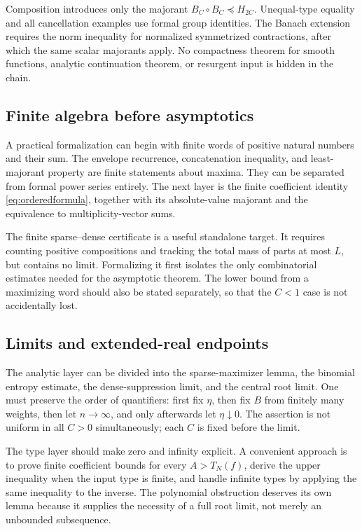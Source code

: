 \documentclass[11pt,a4paper]{article}
\numberwithin{equation}{section}
\theoremstyle{definition}
\theoremstyle{remark}
\newcommand{\Type}{T_N}
\begin{document}
Composition introduces only the majorant
$B_C\circ B_C\preceq H_{2C}$. Unequal-type equality and all cancellation
examples use formal group identities. The Banach extension requires the
norm inequality for normalized symmetrized contractions, after which the
same scalar majorants apply. No compactness theorem for smooth functions,
analytic continuation theorem, or resurgent input is hidden in the chain.

\subsection{Finite algebra before asymptotics}

A practical formalization can begin with finite words of positive natural
numbers and their sum. The envelope recurrence, concatenation inequality,
and least-majorant property are finite statements about maxima. They can
be separated from formal power series entirely. The next layer is the
finite coefficient identity \eqref{eq:orderedformula}, together with
its absolute-value majorant and the equivalence to multiplicity-vector
sums.

The finite sparse--dense certificate is a useful standalone target. It
requires counting positive compositions and tracking the total mass of
parts at most $L$, but contains no limit. Formalizing it first isolates
the only combinatorial estimates needed for the asymptotic theorem.
The lower bound from a maximizing word should also be stated separately,
so that the $C<1$ case is not accidentally lost.

\subsection{Limits and extended-real endpoints}

The analytic layer can be divided into the sparse-maximizer lemma, the
binomial entropy estimate, the dense-suppression limit, and the central
root limit. One must preserve the order of quantifiers: first fix
$\eta$, then fix $B$ from finitely many weights, then let $n\to\infty$,
and only afterwards let $\eta\downarrow0$. The assertion is not uniform
in all $C>0$ simultaneously; each $C$ is fixed before the limit.

The type layer should make zero and infinity explicit. A convenient
approach is to prove finite coefficient bounds for every
$A>\Type(f)$, derive the upper inequality when the input type is finite,
and handle infinite types by applying the same inequality to the inverse.
The polynomial obstruction deserves its own lemma because it supplies
the necessity of a full root limit, not merely an unbounded subsequence.
\end{document}
